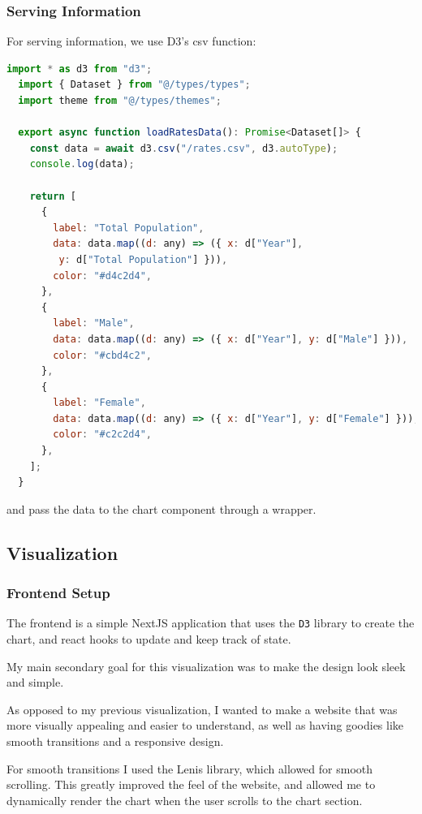 \documentclass{article}
\begin{document}
\subsubsection{Serving Information} 
\label{subsubsec:Serving Backend Server}

For serving information, we use D3's csv function:

\begin{lstlisting}[language=JavaScript]
  import * as d3 from "d3";
  import { Dataset } from "@/types/types";
  import theme from "@/types/themes";
  
  export async function loadRatesData(): Promise<Dataset[]> {
    const data = await d3.csv("/rates.csv", d3.autoType); 
    console.log(data); 
  
    return [
      {
        label: "Total Population",
        data: data.map((d: any) => ({ x: d["Year"],
         y: d["Total Population"] })), 
        color: "#d4c2d4", 
      },
      {
        label: "Male",
        data: data.map((d: any) => ({ x: d["Year"], y: d["Male"] })),
        color: "#cbd4c2", 
      },
      {
        label: "Female",
        data: data.map((d: any) => ({ x: d["Year"], y: d["Female"] })), 
        color: "#c2c2d4", 
      },
    ];
  }  
\end{lstlisting}

and pass the data to the chart component through a wrapper.

\subsection{Visualization}
\label{subsec:Visualization}

\subsubsection{Frontend Setup}
\label{subsubsec:Frontend}

The frontend is a simple NextJS application that uses the 
\texttt{D3} library to create the chart, and react hooks to update 
and keep track of state.

My main secondary goal for this visualization was to make the 
design look sleek and simple. 

As opposed to my previous visualization, I wanted to make a website that
was more visually appealing and easier to understand, as well as having 
goodies like smooth transitions and a responsive design.

For smooth transitions I used the Lenis library, which allowed for smooth 
scrolling. This greatly improved the feel of the website, and allowed me 
to dynamically render the chart when the user scrolls to the chart section.
\end{document}
